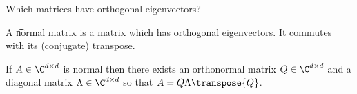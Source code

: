 

Which matrices have orthogonal eigenvectors?


A \t{normal matrix} is a matrix which has orthogonal eigenvectors.
It commutes with its (conjugate) transpose.


If $A \in \C^{d \times d}$ is normal then there exists an orthonormal matrix $Q \in \C^{d \times d}$ and a diagonal matrix $\Lambda \in \C^{d \times d}$ so that $A = Q\Lambda\transpose{Q}$.



\blankpage
